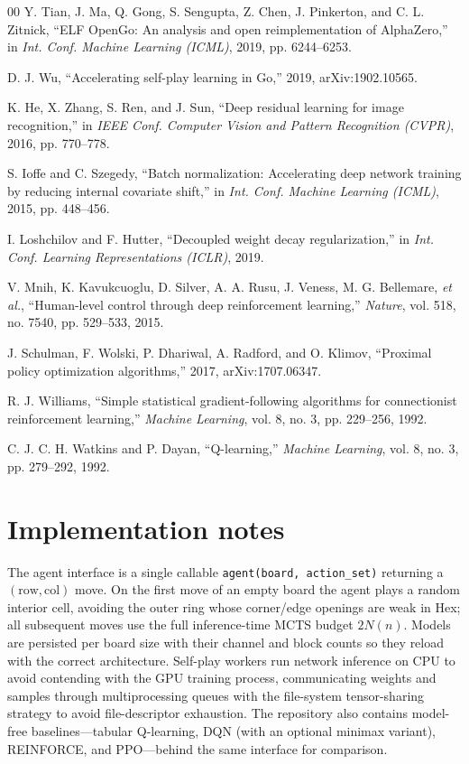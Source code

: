 \documentclass[conference]{IEEEtran}
\begin{document}
\begin{thebibliography}{00}
  Y. Tian, J. Ma, Q. Gong, S. Sengupta, Z. Chen, J. Pinkerton, and C. L. Zitnick, ``ELF OpenGo: An analysis and open reimplementation of AlphaZero,'' in \emph{Int. Conf. Machine Learning (ICML)}, 2019, pp. 6244--6253.

  D. J. Wu, ``Accelerating self-play learning in Go,'' 2019, arXiv:1902.10565.

  K. He, X. Zhang, S. Ren, and J. Sun, ``Deep residual learning for image recognition,'' in \emph{IEEE Conf. Computer Vision and Pattern Recognition (CVPR)}, 2016, pp. 770--778.

  S. Ioffe and C. Szegedy, ``Batch normalization: Accelerating deep network training by reducing internal covariate shift,'' in \emph{Int. Conf. Machine Learning (ICML)}, 2015, pp. 448--456.

  I. Loshchilov and F. Hutter, ``Decoupled weight decay regularization,'' in \emph{Int. Conf. Learning Representations (ICLR)}, 2019.

  V. Mnih, K. Kavukcuoglu, D. Silver, A. A. Rusu, J. Veness, M. G. Bellemare, \emph{et al.}, ``Human-level control through deep reinforcement learning,'' \emph{Nature}, vol. 518, no. 7540, pp. 529--533, 2015.

  J. Schulman, F. Wolski, P. Dhariwal, A. Radford, and O. Klimov, ``Proximal policy optimization algorithms,'' 2017, arXiv:1707.06347.

  R. J. Williams, ``Simple statistical gradient-following algorithms for connectionist reinforcement learning,'' \emph{Machine Learning}, vol. 8, no. 3, pp. 229--256, 1992.

  C. J. C. H. Watkins and P. Dayan, ``Q-learning,'' \emph{Machine Learning}, vol. 8, no. 3, pp. 279--292, 1992.

\end{thebibliography}

\appendices

\section{Implementation notes}
\label{app:impl}
The agent interface is a single callable \texttt{agent(board, action\_set)} returning a
$(\text{row},\text{col})$ move. On the first move of an empty board the agent plays a random
interior cell, avoiding the outer ring whose corner/edge openings are weak in Hex; all
subsequent moves use the full inference-time MCTS budget $2N(n)$. Models are persisted per
board size with their channel and block counts so they reload with the correct architecture.
Self-play workers run network inference on CPU to avoid contending with the GPU training
process, communicating weights and samples through multiprocessing queues with the
file-system tensor-sharing strategy to avoid file-descriptor exhaustion. The repository also
contains model-free baselines---tabular Q-learning, DQN (with an optional minimax variant),
REINFORCE, and PPO---behind the same interface for comparison.
\end{document}
